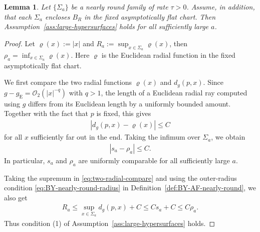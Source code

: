 \documentclass[10pt,a4paper]{amsart}
\newcommand{\gE}{g_{\mathrm{E}}}
\newtheorem{lemma}[theorem]{Lemma}
\begin{document}
	\begin{lemma}\label{lem:BY-nearly-round-geometric-consequences}
		Let $\{\Sigma_a\}$ be a nearly round family of rate $\tau>0$.
		Assume, in addition, that each $\Sigma_a$ encloses $B_R$ in the
		fixed asymptotically flat chart. Then Assumption~\ref{ass:large-hypersurfaces} holds for
		all sufficiently large $a$.
	\end{lemma}
	
	\begin{proof}
		Let $\varrho(x):=|x|$ and $R_a:=\sup_{x\in\Sigma_a}\varrho(x)$, then $\rho_a=\inf_{x\in\Sigma_a}\varrho(x)$. Here $\varrho$ is the Euclidean radial function in the fixed
		asymptotically flat chart.
		
		We first compare the two radial functions $\varrho(x)$ and $d_g(p,x)$. Since
		$g-\gE=\mathcal O_2(|x|^{-q})$ with $q>1$, the length of a Euclidean radial
		ray computed using $g$ differs from its Euclidean length by a
		uniformly bounded amount. Together with the fact that $p$ is fixed,
		this gives
		\begin{align}\label{eq:two-radial-compare}
			\left|
			d_g(p,x)-\varrho(x)
			\right|
			\leq
			C
		\end{align}
		for all $x$ sufficiently far out in the end. Taking the infimum over
		$\Sigma_a$, we obtain
		\begin{align}\label{eq:BY-nearly-round-scale-comparison}
			|s_a-\rho_a|
			\leq
			C.
		\end{align}
		In particular, $s_a$ and $\rho_a$ are uniformly comparable for all sufficiently
		large $a$.
		
		Taking the supremum in \eqref{eq:two-radial-compare} and using the outer-radius condition \eqref{eq:BY-nearly-round-radius} in Definition~\ref{def:BY-AF-nearly-round}, we also get
		\begin{align*}
			R_a
			\leq
			\sup_{x\in\Sigma_a}d_g(p,x)+C
			\leq
			Cs_a+C
			\leq
			C\rho_a.
		\end{align*}
		Thus condition \textup{(1)} of
		Assumption~\ref{ass:large-hypersurfaces} holds.
		

\end{proof}
\end{document}
